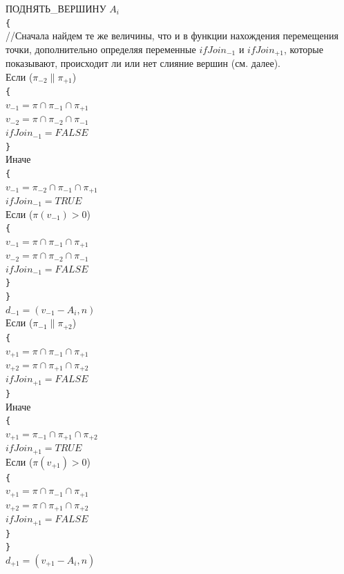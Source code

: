 \documentclass[a4paper,12pt, titlepage]{article}
\begin{document}
\begin{flushleft}
 ПОДНЯТЬ\_ВЕРШИНУ $A_{i}$\\
\verb"{"\\
\quad//Сначала найдем те же величины, что и в функции нахождения перемещения точки, дополнительно определяя
переменные $ifJoin_{-1}$ и $ifJoin_{+1}$, которые показывают, происходит ли или нет слияние вершин (см. далее).\\
\quad Если ($\pi_{-2} \parallel \pi_{+1}$)\\
\quad\verb"{"\\
\quad\quad $v_{-1} = \pi \cap \pi_{-1} \cap \pi_{+1}$\\
\quad\quad $v_{-2} = \pi \cap \pi_{-2} \cap \pi_{-1}$\\
\quad\quad $ifJoin_{-1} = FALSE$\\
\quad\verb"}" \\
\quad Иначе \\
\quad\verb"{"\\
\quad\quad $v_{-1} = \pi_{-2} \cap \pi_{-1} \cap \pi_{+1}$\\
\quad\quad $ifJoin_{-1} = TRUE$\\
\quad\quad Если ($\pi(v_{-1}) > 0$)\\
\quad\quad \verb"{"\\
\quad\quad\quad $v_{-1} = \pi \cap \pi_{-1} \cap \pi_{+1}$\\
\quad\quad\quad $v_{-2} = \pi \cap \pi_{-2} \cap \pi_{-1}$\\
\quad\quad\quad $ifJoin_{-1} = FALSE$\\
\quad\quad\verb"}" \\
\quad\verb"}" \\
\quad $d_{-1} = (v_{-1} - A_{i}, n)$\\

\quad Если ($\pi_{-1} \parallel \pi_{+2}$)\\
\quad \verb"{" \\
\quad\quad $v_{+1} = \pi \cap \pi_{-1} \cap \pi_{+1}$\\
\quad\quad $v_{+2} = \pi \cap \pi_{+1} \cap \pi_{+2}$\\
\quad\quad $ifJoin_{+1} = FALSE$\\
\quad \verb"}"\\
\quad Иначе \\
\quad \verb"{" \\
\quad\quad $v_{+1} = \pi_{-1} \cap \pi_{+1} \cap \pi_{+2}$\\
\quad\quad $ifJoin_{+1} = TRUE$\\
\quad\quad Если ($\pi(v_{+1}) > 0$)\\
\quad\quad \verb"{"\\
\quad\quad\quad $v_{+1} = \pi \cap \pi_{-1} \cap \pi_{+1}$\\
\quad\quad\quad $v_{+2} = \pi \cap \pi_{+1} \cap \pi_{+2}$\\
\quad\quad\quad $ifJoin_{+1} = FALSE$\\
\quad\quad \verb"}"\\
\quad \verb"}"\\
\quad $d_{+1} = (v_{+1} - A_{i}, n)$\\


\end{flushleft}
\end{document}
